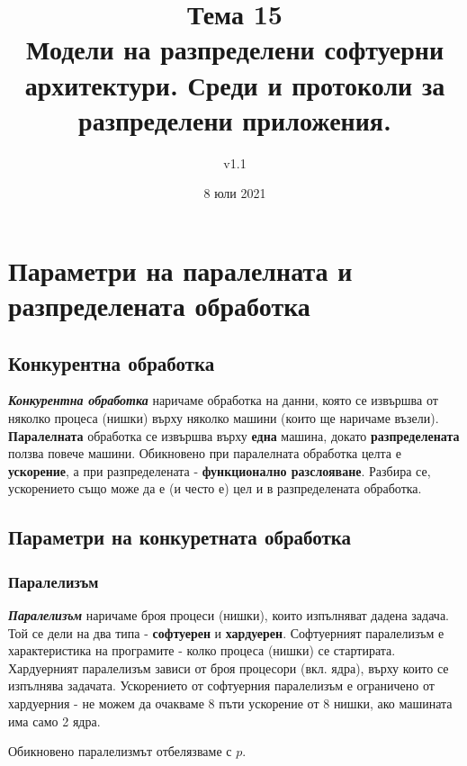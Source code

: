 \documentclass[fleqn,12pt]{article}
\title{Тема 15\\ Модели на разпределени софтуерни архитектури. Среди и протоколи за разпределени приложения.}
\author{v1.1}
\date{8 юли 2021}
\begin{document}
\maketitle
\tableofcontents
\pagebreak

\section{Параметри на паралелната и разпределената обработка}

\subsection{Конкурентна обработка}

\textbf{\textit{Конкурентна обработка}} наричаме обработка на данни, която се извършва от няколко процеса (нишки)
върху няколко машини (които ще наричаме възели). \textbf{Паралелната} обработка се извършва върху \textbf{една} машина,
докато \textbf{разпределената} ползва повече машини. Обикновено при паралелната обработка целта е \textbf{ускорение},
а при разпределената - \textbf{функционално разслояване}. Разбира се, ускорението също може да е (и често е) цел 
и в разпределената обработка.

\subsection{Параметри на конкуретната обработка}

\subsubsection{Паралелизъм}
\textbf{\textit{Паралелизъм}} наричаме броя процеси (нишки), които изпълняват дадена задача.
Той се дели на два типа - \textbf{софтуерен} и \textbf{хардуерен}. Софтуерният паралелизъм е 
характеристика на програмите - колко процеса (нишки) се стартирата. Хардуерният паралелизъм 
зависи от броя процесори (вкл. ядра), върху които се изпълнява задачата.
Ускорението от софтуерния паралелизъм е ограничено от хардуерния - не можем да очакваме 
8 пъти ускорение от 8 нишки, ако машината има само 2 ядра.

Обикновено паралелизмът отбелязваме с $p$.
\end{document}
